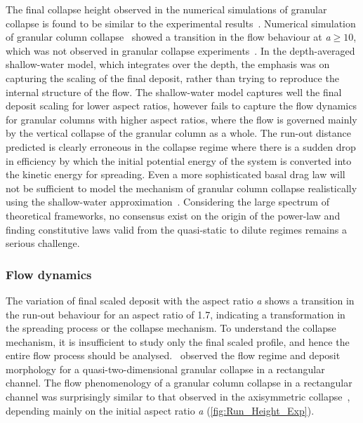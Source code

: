 The final collapse height observed in the numerical simulations of granular 
collapse is found to be similar to the experimental 
results~\citep{Lube2005,Balmforth2005}. Numerical simulation of granular 
column collapse~\citep{Lacaze2008,Staron2007a} showed a transition in the flow 
behaviour at \textit{a}$\ge 10$, which was not observed in granular collapse 
experiments~\citep{Balmforth2005,Lube2005,Lajeunesse2004}. In the 
depth-averaged shallow-water model, which integrates over the depth, the 
emphasis was on capturing the scaling of the final deposit, rather than trying 
to reproduce the internal structure of the flow. The shallow-water model 
captures well the final deposit scaling for lower aspect ratios, however fails 
to capture the flow dynamics for granular columns with higher aspect ratios, 
where the flow is governed mainly by the vertical collapse of the granular 
column as a whole. The run-out distance predicted is clearly erroneous in the 
collapse regime where there is a sudden drop in efficiency by which the initial 
potential energy of the system is converted into the kinetic energy for 
spreading. Even a more sophisticated basal drag law will not be sufficient to 
model the mechanism of granular column collapse realistically using the 
shallow-water approximation~\citep{Kerswell2005}. Considering the large 
spectrum of theoretical frameworks, no consensus exist on the origin of the 
power-law and finding constitutive laws valid from the quasi-static to dilute 
regimes remains a serious challenge. 


\subsubsection{Flow dynamics}


The variation of final scaled deposit with the aspect ratio \textit{a} shows a 
transition in the run-out behaviour for an aspect ratio of 1.7, indicating a 
transformation in the spreading process or the collapse mechanism. To 
understand the collapse mechanism, it is insufficient to study only the final 
scaled profile, and hence the entire flow process should be 
analysed.~\citet{Lajeunesse2005} observed the flow regime and deposit 
morphology for a quasi-two-dimensional granular collapse in a rectangular 
channel. The flow phenomenology of a granular column collapse in a rectangular 
channel was surprisingly similar to that observed in the axisymmetric 
collapse~\citep{Lube2005,Lajeunesse2004}, depending mainly on the initial 
aspect ratio \textit{a} (\cref{fig:Run_Height_Exp}). 

